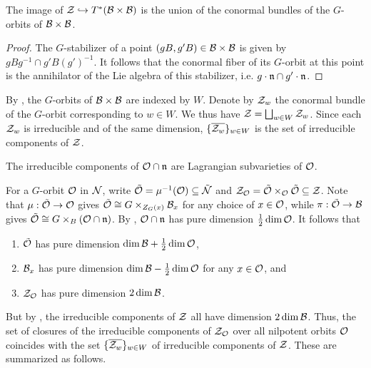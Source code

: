 \begin{lemma}{}
    The image of $\mathcal{Z} \hookrightarrow T^*(\mathcal{B} \times \mathcal{B})$ is the union of the conormal bundles of the $G$-orbits of $\mathcal{B} \times \mathcal{B}$.
    \begin{proof}
        The $G$-stabilizer of a point $(gB, g'B) \in \mathcal{B} \times \mathcal{B}$ is given by $gBg^{-1} \cap g'B(g')^{-1}$. It follows that the conormal fiber of its $G$-orbit at this point is the annihilator of the Lie algebra of this stabilizer, i.e. $g \cdot \mathfrak{n} \cap g' \cdot \mathfrak{n}$.
    \end{proof}
\end{lemma}

By , the $G$-orbits of $\mathcal{B} \times \mathcal{B}$ are indexed by $W$. Denote by $\mathcal{Z}_w$ the conormal bundle of the $G$-orbit corresponding to $w \in W$. We thus have $\mathcal{Z} = \bigsqcup_{w \in W} \mathcal{Z}_w$. Since each $\mathcal{Z}_w$ is irreducible and of the same dimension, $\{\overline{\mathcal{Z}_w}\}_{w \in W}$ is the set of irreducible components of $\mathcal{Z}$.

\begin{theorem}{}
    The irreducible components of $\mathcal{O} \cap \mathfrak{n}$ are Lagrangian subvarieties of $\mathcal{O}$.
\end{theorem}

For a $G$-orbit $\mathcal{O}$ in $\mathcal{N}$, write $\tilde{\mathcal{O}} = \mu^{-1}(\mathcal{O}) \subseteq \tilde{\mathcal{N}}$ and $\mathcal{Z}_{\mathcal{O}} = \tilde{\mathcal{O}} \times_{\mathcal{O}} \tilde{\mathcal{O}} \subseteq \mathcal{Z}$. Note that $\mu : \tilde{\mathcal{O}} \to \mathcal{O}$ gives $\tilde{\mathcal{O}} \cong G \times_{Z_G(x)} \mathcal{B}_x$ for any choice of $x \in \mathcal{O}$, while $ \pi : \tilde{\mathcal{O}} \to \mathcal{B}$ gives $\tilde{\mathcal{O}} \cong G \times_B (\mathcal{O} \cap \mathfrak{n})$. By , $\mathcal{O} \cap \mathfrak{n}$ has pure dimension $\frac{1}{2} \dim \mathcal{O}$. It follows that
\begin{enumerate}
    \item $\tilde{\mathcal{O}}$ has pure dimension $\dim \mathcal{B} + \frac{1}{2} \dim \mathcal{O}$,
    \item $\mathcal{B}_x$ has pure dimension $\dim \mathcal{B} - \frac{1}{2} \dim \mathcal{O}$ for any $x \in \mathcal{O}$, and
    \item $\mathcal{Z}_{\mathcal{O}}$ has pure dimension $2\dim \mathcal{B}$.
\end{enumerate}
But by , the irreducible components of $\mathcal{Z}$ all have dimension $2\dim \mathcal{B}$. Thus, the set of closures of the irreducible components of $\mathcal{Z}_{\mathcal{O}}$ over all nilpotent orbits $\mathcal{O}$ coincides with the set $\{\overline{\mathcal{Z}_w}\}_{w \in W}$ of irreducible components of $\mathcal{Z}$. These are summarized as follows.

